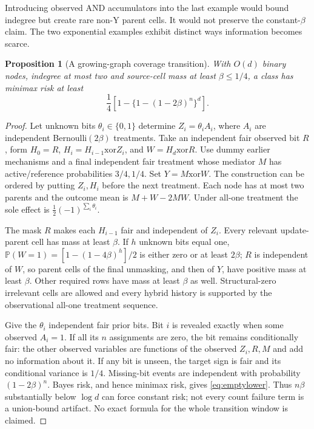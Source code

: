 \documentclass[11pt,a4paper]{article}
\numberwithin{equation}{section}
\newtheorem{proposition}[theorem]{Proposition}
\theoremstyle{definition}
\newcommand{\Prb}{\mathbb P}
\begin{document}
Introducing observed AND accumulators into the last example would bound
indegree but create rare non-Y parent cells. It would not preserve the
constant-$\beta$ claim. The two exponential examples exhibit distinct
ways information becomes scarce.

\begin{proposition}[A growing-graph coverage transition]\label{prop:empty}
With $O(d)$ binary nodes, indegree at most two and source-cell mass at
least $\beta\le1/4$, a class has minimax risk at least
\begin{equation}\label{eq:emptylower}
 \frac14\left[1-\{1-(1-2\beta)^n\}^d\right].
\end{equation}
\end{proposition}
\begin{proof}
Let unknown bits $\theta_i\in\{0,1\}$ determine
$Z_i=\theta_i A_i$, where $A_i$ are independent Bernoulli$(2\beta)$
treatments. Take an independent fair observed bit $R$, form
$H_0=R$, $H_i=H_{i-1}\mathbin{\mathrm{xor}} Z_i$, and
$W=H_d\mathbin{\mathrm{xor}} R$. Use dummy earlier mechanisms and a
final independent fair treatment whose mediator $M$ has active/reference
probabilities $3/4,1/4$. Set $Y=M\mathbin{\mathrm{xor}} W$.
The construction can be ordered by putting $Z_i,H_i$ before the next
treatment. Each node has at most two parents and the outcome mean is
$M+W-2MW$. Under all-one treatment the sole effect is
$\frac12(-1)^{\sum_i\theta_i}$.

The mask $R$ makes each $H_{i-1}$ fair and independent of $Z_i$.
Every relevant update-parent cell has mass at least $\beta$. If $h$
unknown bits equal one, $\Prb(W=1)=[1-(1-4\beta)^h]/2$ is either
zero or at least $2\beta$; $R$ is independent of $W$, so parent cells
of the final unmasking, and then of $Y$, have positive mass at least
$\beta$. Other required rows have mass at least $\beta$ as well.
Structural-zero irrelevant cells are allowed and every hybrid history
is supported by the observational all-one treatment sequence.

Give the $\theta_i$ independent fair prior bits. Bit $i$ is revealed
exactly when some observed $A_i=1$. If all its $n$ assignments are zero,
the bit remains conditionally fair: the other observed variables are
functions of the observed $Z_i,R,M$ and add no information about it.
If any bit is unseen, the target sign is fair and its conditional variance
is $1/4$. Missing-bit events are independent with probability
$(1-2\beta)^n$. Bayes risk, and hence minimax risk, gives
\eqref{eq:emptylower}. Thus $n\beta$ substantially below $\log d$
can force constant risk; not every count failure term is a union-bound
artifact. No exact formula for the whole transition window is claimed.
\end{proof}
\end{document}
